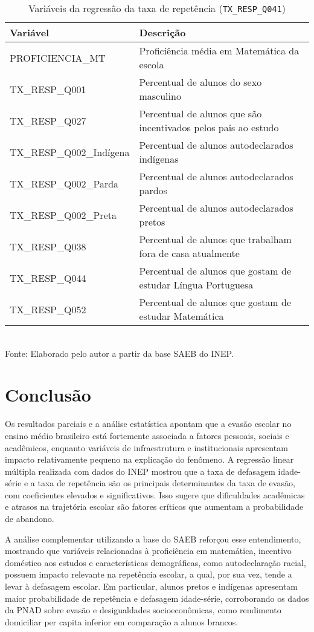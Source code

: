 \documentclass[english, spanish, brazilian]{RBIEarticle} %
\begin{document}
\begin{table}[htbp]
\centering
\caption{Variáveis da regressão da taxa de repetência (\texttt{TX\_RESP\_Q041})}
\label{tab:vars_tx_resp_q041}
\small
\begin{tabular}{lp{10cm}}
\hline
\textbf{Variável} & \textbf{Descrição} \\
\hline
PROFICIENCIA\_MT & Proficiência média em Matemática da escola \\
TX\_RESP\_Q001 & Percentual de alunos do sexo masculino \\
TX\_RESP\_Q027 & Percentual de alunos que são incentivados pelos pais ao estudo \\
TX\_RESP\_Q002\_Indígena & Percentual de alunos autodeclarados indígenas \\
TX\_RESP\_Q002\_Parda & Percentual de alunos autodeclarados pardos \\
TX\_RESP\_Q002\_Preta & Percentual de alunos autodeclarados pretos \\
TX\_RESP\_Q038 & Percentual de alunos que trabalham fora de casa atualmente \\
TX\_RESP\_Q044 & Percentual de alunos que gostam de estudar Língua Portuguesa \\
TX\_RESP\_Q052 & Percentual de alunos que gostam de estudar Matemática \\
\hline
\end{tabular}
\\[2mm]
\footnotesize\centering Fonte: Elaborado pelo autor a partir da base SAEB do INEP.
\end{table}

\pagebreak
\section{Conclusão}
Os resultados parciais e a análise estatística apontam que a evasão escolar no ensino médio brasileiro está fortemente associada a fatores pessoais, sociais e acadêmicos, enquanto variáveis de infraestrutura e institucionais apresentam impacto relativamente pequeno na explicação do fenômeno. A regressão linear múltipla realizada com dados do INEP mostrou que a taxa de defasagem idade-série e a taxa de repetência são os principais determinantes da taxa de evasão, com coeficientes elevados e significativos. Isso sugere que dificuldades acadêmicas e atrasos na trajetória escolar são fatores críticos que aumentam a probabilidade de abandono.

A análise complementar utilizando a base do SAEB reforçou esse entendimento, mostrando que variáveis relacionadas à proficiência em matemática, incentivo doméstico aos estudos e características demográficas, como autodeclaração racial, possuem impacto relevante na repetência escolar, a qual, por sua vez, tende a levar à defasagem escolar. Em particular, alunos pretos e indígenas apresentam maior probabilidade de repetência e defasagem idade-série, corroborando os dados da PNAD sobre evasão e desigualdades socioeconômicas, como rendimento domiciliar per capita inferior em comparação a alunos brancos.
\end{document}
